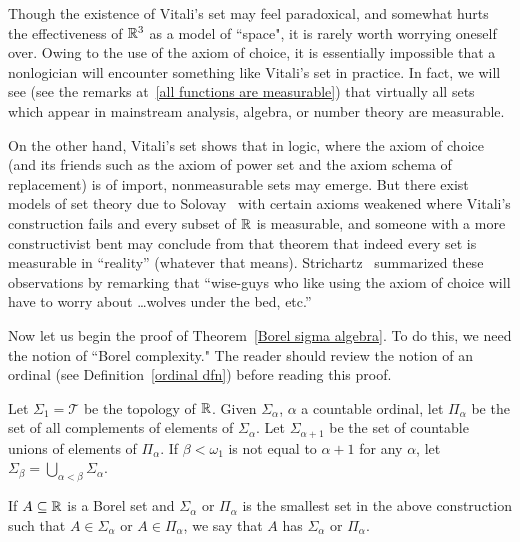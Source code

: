\begin{subsec}
Though the existence of Vitali's set may feel paradoxical, and somewhat hurts the effectiveness of $\mathbb{R}^3$ as a model of ``space", it is rarely worth worrying oneself over.
Owing to the use of the axiom of choice, it is essentially impossible that a nonlogician will encounter something like Vitali's set in practice.
In fact, we will see (see the remarks at~\ref{all functions are measurable}) that virtually all sets which appear in mainstream analysis, algebra, or number theory are measurable.

On the other hand, Vitali's set shows that in logic, where the axiom of choice (and its friends such as the axiom of power set and the axiom schema of replacement) is of import, nonmeasurable sets may emerge.
But there exist models of set theory due to Solovay~\cite{Solovay1970} with certain axioms weakened where Vitali's construction fails and every subset of $\mathbb{R}$ is measurable, and someone with a more constructivist bent may conclude from that theorem that indeed every set is measurable in ``reality'' (whatever that means).
Strichartz~\cite[Chapter 1]{strichartz2003guide} summarized these observations by remarking that ``wise-guys who like using the axiom of choice will have to worry about \dots wolves under the bed, etc.''
\end{subsec}

\begin{subsec}
Now let us begin the proof of Theorem~\ref{Borel sigma algebra}.
To do this, we need the notion of ``Borel complexity."
The reader should review the notion of an ordinal (see Definition~\ref{ordinal dfn}) before reading this proof.
\end{subsec}

\begin{definition}
Let $\Sigma_{1} = \mathcal T$ be the topology of $\mathbb{R}$.
Given $\Sigma_{\alpha}$, $\alpha$ a countable ordinal, let $\Pi_{\alpha}$ be the set of all complements of elements of $\Sigma_{\alpha}$.
Let $\Sigma_{\alpha+1}$ be the set of countable unions of elements of $\Pi_{\alpha}$.
If $\beta < \omega_{1}$ is not equal to $\alpha+1$ for any $\alpha$, let $\Sigma_{\beta} = \bigcup_{\alpha < \beta} \Sigma_{\alpha}$.

If $A \subseteq \mathbb{R}$ is a Borel set and $\Sigma_{\alpha}$ or $\Pi_{\alpha}$ is the smallest set in the above construction such that $A \in \Sigma_{\alpha}$ or $A \in \Pi_{\alpha}$, we say that $A$ has  $\Sigma_{\alpha}$ or $\Pi_{\alpha}$.
\end{definition}

